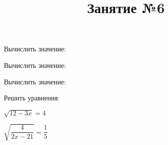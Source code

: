 %
%
\newpage
\title{Занятие №6}
\begin{listofex}
	\item Вычислить значение:
	\begin{enumcols}[itemcolumns=3]
		\item {}
		\item {}
		\item {}
		\item {}
		\item {}
		\item {}
	\end{enumcols}
	\item Вычислить значение:
	\begin{enumcols}[itemcolumns=2]
		\item {}
		\item {}
		\item {}
		\item {}
		\item {}
	\end{enumcols}
	\item Вычислить значение:
	\begin{enumcols}[itemcolumns=2]
		\item {}
		\item {}
		\item {}
	\end{enumcols}
	\item {}
	\item Решить уравнения:
	\begin{enumcols}[itemcolumns=2]
		\item {}
		\item \( \sqrt{12-3x}=4 \)
		\item \( \sqrt{\dfrac{4}{2x-21}}=\dfrac{1}{5} \)
		\item {}
	\end{enumcols}
\end{listofex}
